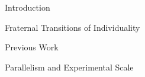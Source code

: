 \begin{block}{Introduction}

\begin{alertblock}{Fraternal Transitions of Individuality}

\end{alertblock}

\begin{alertblock}{Previous Work}

\vspace{-2ex}
\end{alertblock}

\begin{alertblock}{Parallelism and Experimental Scale}

\end{alertblock}

\end{block}
